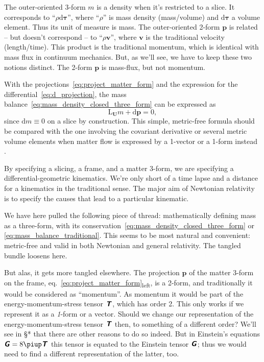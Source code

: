 \documentclass[\ifafour a4paper,12pt,\else a5paper,10pt,\fi%
onecolumn,oneside,article,%
british%
]{memoir}
\theoremstyle{remark}
\theoremstyle{innote}
\newcommand*{\mathte}[1]{\textbf{\textit{\textsf{#1}}}}
\newcommand*{\citep}{\parencites}
\newcommand*{\pu}{\piup}%
\newcommand*{\di}{\mathrm{d}}%
\renewcommand*{\|}{\nonscript\,\vert\nonscript\;\mathopen{}}
\newcommand*{\sect}{\S}%
\newcommand*{\eqn}{eq.}%
\newcommand*{\eg}{{e.g.}}
\newcommand*{\Li}{\mathrm{L}}
\newcommand*{\ydd}{m}
\newcommand*{\yd}{\ydd}
\newcommand*{\yjj}{p}
\newcommand*{\yj}{\bm{\yjj}}
\newcommand*{\yGG}{G}
\newcommand*{\yG}{\mathte{\yGG}}
\newcommand*{\yTTf}{T}
\newcommand*{\yTf}{\mathte{\yTTf}}
\newcommand*{\yFF}{U}
\newcommand*{\yF}{\bm{\yFF}}
\begin{document}
The outer-oriented 3-form $\yd$ is a density when it's restricted to a
slice. It corresponds to \enquote{$\rho\di\bm{\tau}$}, where
\enquote{$\rho$} is mass density (mass/volume) and {$\di\bm{\tau}$} a
volume element. Thus its unit of measure is mass. The outer-oriented 2-form
$\yj$ is related -- but doesn't correspond -- to \enquote{$\rho\bm{v}$},
where {$\bm{v}$} is the traditional velocity (length/time). This product is
the traditional momentum, which is identical with mass flux in continuum
mechanics. But, as we'll see, we have to  keep these two notions distinct.
The 2-form $\yj$ is mass-flux, but not momentum.

With the projections~\eqref{eq:project_matter_form} and the expression for
the differential~\eqref{eq:d_projection}, the mass
balance~\eqref{eq:mass_density_closed_three_form} can be expressed as
\begin{equation}
  \label{eq:mass_balance_traditional}
  \Li_{\yF}\yd + \di\yj = 0,
\end{equation}
since $\di\yd\equiv 0$ on a slice by construction. This simple, metric-free
formula should be compared with the one involving the covariant derivative
or several metric volume elements when matter flow is expressed by a
1-vector or a 1-form instead \citep[\eg][\eqn~(7.205), \sect~7.3,
p.~361]{rezzollaetal2013}.

By specifying a slicing, a frame, and a matter 3-form, we are specifying a
differential-geometric kinematics. We're only short of a time lapse and a
distance for a kinematics in the traditional sense. The major aim of
Newtonian relativity is to specify the causes that lead to a particular
kinematic.

\medskip

We have here pulled the following piece of thread: mathematically defining
mass as a three-form, with its
conservation~\eqref{eq:mass_density_closed_three_form} or
\eqref{eq:mass_balance_traditional}. This seems to be most natural and
convenient: metric-free and valid in both Newtonian and general relativity.
The tangled bundle loosens here.

But alas, it gets more tangled elsewhere. The projection $\yj$ of the
matter 3-form on the frame,
\eqn~\eqref{eq:project_matter_form}\textsubscript{left}, is a 2-form, and
traditionally it would be considered as \enquote{momentum}. As momentum it
would be part of the energy-momentum-stress tensor $\yTf$, which has order
2. This only works if we represent it as a \emph{1}-form or a vector.
Should we change our representation of the energy-momentum-stress tensor
$\yTf$ then, to something of a different order? We'll see in \sect** that
there are other reasons to do so indeed. But in Einstein's equations
$\yG = 8\pu\yTf$ this tensor is equated to the Einstein tensor $\yG$; thus
we would need to find a different representation of the latter, too.
\end{document}
